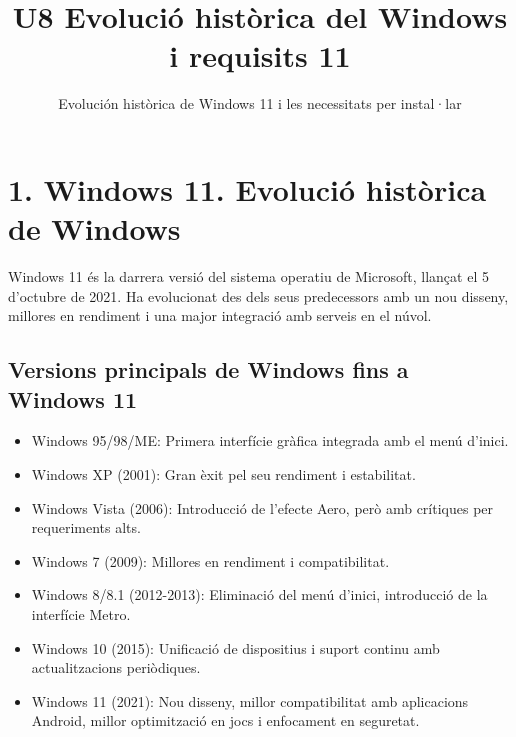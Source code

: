 \documentclass[
  12 pt,
  a4paper,
]{article}
\title{U8 Evolució històrica del Windows i requisits 11}
\subtitle{Evolución històrica de Windows 11 i les necessitats per
instal·lar}
\author{}
\date{\vspace{-2.5em}}
\providecommand{\tightlist}{%
  \setlength{\itemsep}{0pt}\setlength{\parskip}{0pt}}
\begin{document}
\maketitle

{
\setcounter{tocdepth}{2}
\tableofcontents
}
\newpage
\renewcommand\tablename{Tabla}

\section{1. Windows 11. Evolució històrica de
Windows}\label{windows-11.-evoluciuxf3-histuxf2rica-de-windows}

Windows 11 és la darrera versió del sistema operatiu de Microsoft,
llançat el 5 d'octubre de 2021. Ha evolucionat des dels seus
predecessors amb un nou disseny, millores en rendiment i una major
integració amb serveis en el núvol.

\subsection{Versions principals de Windows fins a Windows
11}\label{versions-principals-de-windows-fins-a-windows-11}

\begin{itemize}
\tightlist
\item
  Windows 95/98/ME: Primera interfície gràfica integrada amb el menú
  d'inici.\\
\item
  Windows XP (2001): Gran èxit pel seu rendiment i estabilitat.\\
\item
  Windows Vista (2006): Introducció de l'efecte Aero, però amb crítiques
  per requeriments alts.\\
\item
  Windows 7 (2009): Millores en rendiment i compatibilitat.\\
\item
  Windows 8/8.1 (2012-2013): Eliminació del menú d'inici, introducció de
  la interfície Metro.\\
\item
  Windows 10 (2015): Unificació de dispositius i suport continu amb
  actualitzacions periòdiques.\\
\item
  Windows 11 (2021): Nou disseny, millor compatibilitat amb aplicacions
  Android, millor optimització en jocs i enfocament en seguretat.
\end{itemize}
\end{document}
